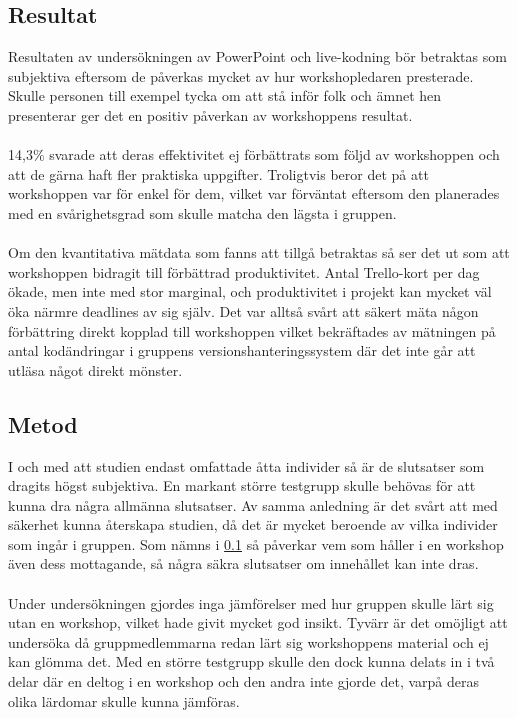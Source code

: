 \subsection{Resultat}
\label{sec:seba-discussion-results}
Resultaten av undersökningen av PowerPoint och live-kodning bör betraktas som subjektiva
eftersom de påverkas mycket av hur workshopledaren presterade.
Skulle personen till exempel tycka om att stå inför folk och ämnet hen presenterar ger det
en positiv påverkan av workshoppens resultat. 
\\ \\
14,3\% svarade att deras effektivitet ej förbättrats som följd
av workshoppen och att de gärna haft fler praktiska uppgifter.
Troligtvis beror det på att workshoppen var för enkel för dem,
vilket var förväntat eftersom den planerades med en svårighetsgrad
som skulle matcha den lägsta i gruppen.
\\ \\
Om den kvantitativa mätdata som fanns att tillgå betraktas så ser 
det ut som att workshoppen bidragit till förbättrad produktivitet.
Antal Trello-kort per dag ökade, men inte med stor
marginal, och produktivitet i projekt kan mycket väl
öka närmre deadlines av sig själv. Det var alltså svårt att säkert mäta någon förbättring
direkt kopplad till workshoppen vilket bekräftades av mätningen på antal kodändringar 
i gruppens versionshanteringssystem där det inte går att utläsa något direkt mönster.

\subsection{Metod}
\label{sec:seba-discussion-method}
I och med att studien endast omfattade åtta individer så är de slutsatser som dragits
högst subjektiva. En markant större testgrupp skulle behövas för att kunna dra några
allmänna slutsatser. Av samma anledning är det svårt att med säkerhet kunna återskapa
studien, då det är mycket beroende av vilka individer som ingår i gruppen. Som nämns
i \ref{sec:seba-discussion-results} så påverkar vem som håller i en workshop även
dess mottagande, så några säkra slutsatser om innehållet kan inte dras.
\\ \\
Under undersökningen gjordes inga jämförelser med hur gruppen skulle lärt sig
utan en workshop, vilket hade givit mycket god insikt. Tyvärr
är det omöjligt att undersöka då gruppmedlemmarna redan lärt sig workshoppens
material och ej kan glömma det. Med en större testgrupp skulle den dock kunna
delats in i två delar där en deltog i en workshop och den andra inte gjorde det,
varpå deras olika lärdomar skulle kunna jämföras.
